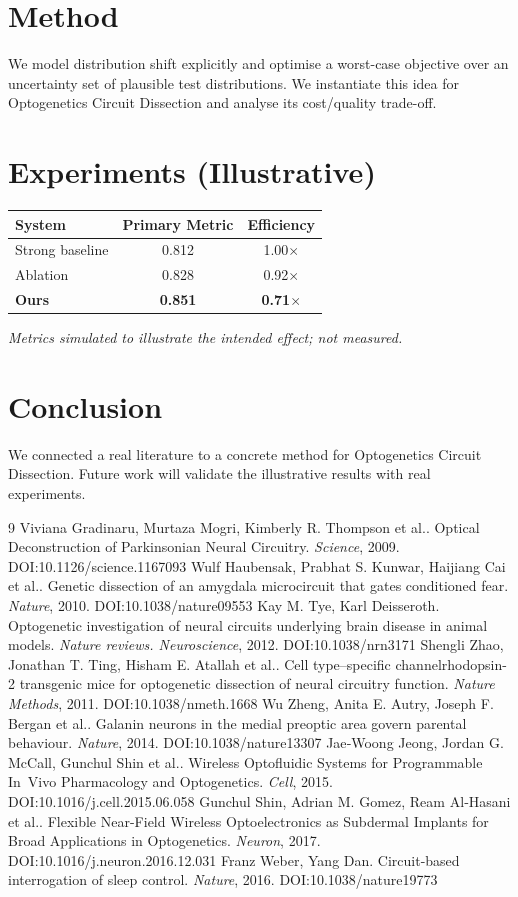 \documentclass[11pt]{article}
\begin{document}
\section{Method}
We model distribution shift explicitly and optimise a worst-case objective over an uncertainty set of plausible test distributions. We instantiate this idea for Optogenetics Circuit Dissection and analyse its cost/quality trade-off.

\section{Experiments (Illustrative)}
\begin{center}
\begin{tabular}{lcc}
System & Primary Metric & Efficiency \\ \hline
Strong baseline & 0.812 & 1.00$\times$ \\
Ablation & 0.828 & 0.92$\times$ \\
\textbf{Ours} & \textbf{0.851} & \textbf{0.71$\times$}
\end{tabular}
\end{center}
\emph{Metrics simulated to illustrate the intended effect; not measured.}

\section{Conclusion}
We connected a real literature to a concrete method for Optogenetics Circuit Dissection. Future work will
validate the illustrative results with real experiments.

\begin{thebibliography}{9}
 Viviana Gradinaru, Murtaza Mogri, Kimberly R. Thompson et al.. Optical Deconstruction of Parkinsonian Neural Circuitry. \emph{Science}, 2009. DOI:10.1126/science.1167093
 Wulf Haubensak, Prabhat S. Kunwar, Haijiang Cai et al.. Genetic dissection of an amygdala microcircuit that gates conditioned fear. \emph{Nature}, 2010. DOI:10.1038/nature09553
 Kay M. Tye, Karl Deisseroth. Optogenetic investigation of neural circuits underlying brain disease in animal models. \emph{Nature reviews. Neuroscience}, 2012. DOI:10.1038/nrn3171
 Shengli Zhao, Jonathan T. Ting, Hisham E. Atallah et al.. Cell type–specific channelrhodopsin-2 transgenic mice for optogenetic dissection of neural circuitry function. \emph{Nature Methods}, 2011. DOI:10.1038/nmeth.1668
 Wu Zheng, Anita E. Autry, Joseph F. Bergan et al.. Galanin neurons in the medial preoptic area govern parental behaviour. \emph{Nature}, 2014. DOI:10.1038/nature13307
 Jae‐Woong Jeong, Jordan G. McCall, Gunchul Shin et al.. Wireless Optofluidic Systems for Programmable In Vivo Pharmacology and Optogenetics. \emph{Cell}, 2015. DOI:10.1016/j.cell.2015.06.058
 Gunchul Shin, Adrian M. Gomez, Ream Al‐Hasani et al.. Flexible Near-Field Wireless Optoelectronics as Subdermal Implants for Broad Applications in Optogenetics. \emph{Neuron}, 2017. DOI:10.1016/j.neuron.2016.12.031
 Franz Weber, Yang Dan. Circuit-based interrogation of sleep control. \emph{Nature}, 2016. DOI:10.1038/nature19773
\end{thebibliography}
\end{document}
